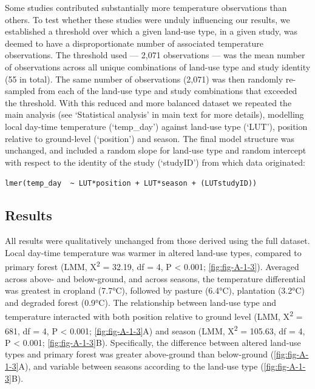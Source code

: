\documentclass[12pt,a4paper,]{report}
\theoremstyle{definition}
\theoremstyle{definition}
\theoremstyle{definition}
\theoremstyle{remark}
\begin{document}
Some studies contributed substantially more temperature observations
than others. To test whether these studies were unduly influencing our
results, we established a threshold over which a given land-use type, in
a given study, was deemed to have a disproportionate number of
associated temperature observations. The threshold used --- 2,071
observations --- was the mean number of observations across all unique
combinations of land-use type and study identity (55 in total). The same
number of observations (2,071) was then randomly re-sampled from each of
the land-use type and study combinations that exceeded the threshold.
With this reduced and more balanced dataset we repeated the main
analysis (see `Statistical analysis' in main text for more details),
modelling local day-time temperature (`temp\_day') against land-use type
(`LUT'), position relative to ground-level (`position') and season. The
final model structure was unchanged, and included a random slope for
land-use type and random intercept with respect to the identity of the
study (`studyID') from which data originated:

\texttt{lmer(temp\_day\ \ \textasciitilde{}\ LUT*position\ +\ LUT*season\ +\ (LUT\textbar{}studyID))}

\subsection{Results}\label{results-2}

All results were qualitatively unchanged from those derived using the
full dataset. Local day-time temperature was warmer in altered land-use
types, compared to primary forest (LMM, Χ\textsuperscript{2} = 32.19, df
= 4, P \textless{} 0.001; \autoref{fig:fig-A-1-3}). Averaged across
above- and below-ground, and across seasons, the temperature
differential was greatest in cropland (7.7°C), followed by pasture
(6.4°C), plantation (3.2°C) and degraded forest (0.9°C). The
relationship between land-use type and temperature interacted with both
position relative to ground level (LMM, Χ\textsuperscript{2} = 681, df =
4, P \textless{} 0.001; \autoref{fig:fig-A-1-3}A) and season (LMM,
Χ\textsuperscript{2} = 105.63, df = 4, P \textless{} 0.001;
\autoref{fig:fig-A-1-3}B). Specifically, the difference between altered
land-use types and primary forest was greater above-ground than
below-ground (\autoref{fig:fig-A-1-3}A), and variable between seasons
according to the land-use type (\autoref{fig:fig-A-1-3}B).

\pagebreak
\end{document}
